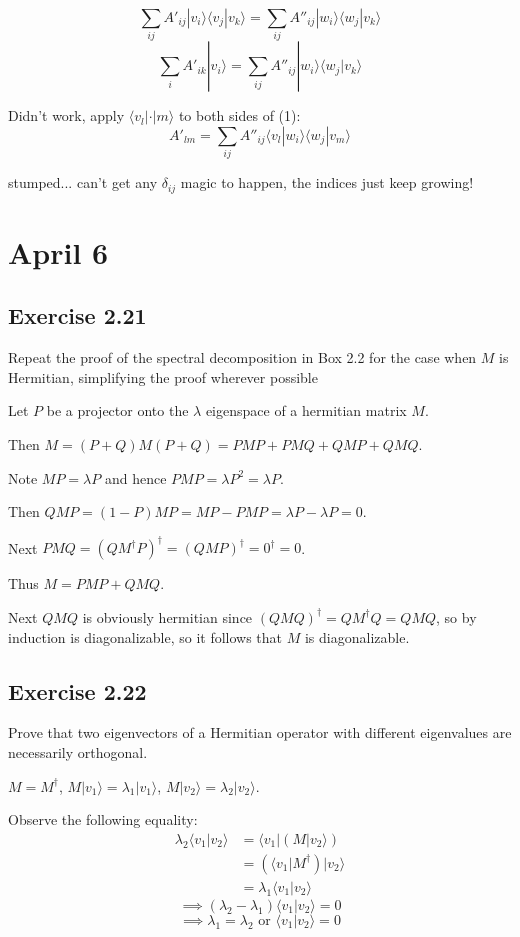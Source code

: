 \documentclass[]{article}
\newcommand{\bra}[1]{\langle #1 |}
\newcommand{\ket}[1]{| #1 \rangle}
\newcommand{\braket}[2]{\langle #1 | #2 \rangle}
\begin{document}
\[\sum_{ij} A'_{ij}\ket{v_i}\braket{v_j}{v_k} = \sum_{ij} A''_{ij}\ket{w_i}\braket{w_j}{v_k}\]
\[\sum_{i} A'_{ik}\ket{v_i} = \sum_{ij} A''_{ij}\ket{w_i}\braket{w_j}{v_k}\]

Didn't work, apply $\bra{v_l}\cdot\ket{m}$ to both sides of (1):
\[A'_{lm} = \sum_{ij} A''_{ij}\braket{v_l}{w_i}\braket{w_j}{v_m}\]

stumped... can't get any $\delta_{ij}$ magic to happen, the indices just keep growing!

\section{April 6}

\subsection{Exercise 2.21}
Repeat the proof of the spectral decomposition in Box 2.2 for the case when $M$ is Hermitian, simplifying the proof wherever possible

Let $P$ be a projector onto the $\lambda$ eigenspace of a hermitian matrix $M$.

Then $M=(P+Q)M(P+Q)=PMP+PMQ+QMP+QMQ$.

Note $MP = \lambda P$ and hence $PMP = \lambda P^2 = \lambda P$.

Then $QMP=(1-P)MP=MP-PMP=\lambda P - \lambda P = 0$.

Next $PMQ=(QM^\dagger P)^\dagger=(QMP)^\dagger=0^\dagger=0$.

Thus $M = PMP + QMQ$.

Next $QMQ$ is obviously hermitian since $(QMQ)^\dagger=QM^\dagger Q=QMQ$, so by induction is diagonalizable, so it follows that $M$ is diagonalizable.

\subsection{Exercise 2.22}
Prove that two eigenvectors of a Hermitian operator with different eigenvalues are necessarily orthogonal.

$M=M^\dagger$, $M\ket{v_1}=\lambda_1\ket{v_1}$, $M\ket{v_2}=\lambda_2\ket{v_2}$.

Observe the following equality:
\begin{align*}
\lambda_2\braket{v_1}{v_2}
&= \bra{v_1}\left(M\ket{v_2}\right) \\
&= \left(\bra{v_1}M^\dagger\right)\ket{v_2} \\
&= \lambda_1\braket{v_1}{v_2}
\end{align*}
\[\implies (\lambda_2-\lambda_1)\braket{v_1}{v_2} = 0\]
\[\implies \lambda_1 = \lambda_2 \text{\ or\ } \braket{v_1}{v_2} = 0\]
\end{document}
